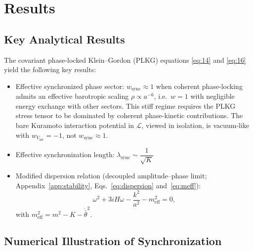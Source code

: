 
\section{Results}
\label{sec:results}

\subsection{Key Analytical Results}
\label{subsec:analytical-results}

The covariant phase-locked Klein--Gordon (PLKG) equations \eqref{eq:14} and \eqref{eq:16}
yield the following key results:
\begin{itemize}
    \item Effective synchronized phase sector: $w_{\text{sync}} \approx 1$
          when coherent phase-locking admits an effective barotropic scaling $\rho\propto a^{-6}$, i.e.\ $w=1$ with negligible energy exchange with other sectors.
          This stiff regime requires the PLKG stress tensor to be dominated by coherent phase-kinetic contributions.
          The bare Kuramoto interaction potential in $\mathcal{L}$, viewed in isolation, is vacuum-like with $w_{V_{\text{int}}}=-1$, not $w_{\text{sync}}\approx 1$.
    \item Effective synchronization length:
          $\lambda_{\text{sync}} \sim \dfrac{1}{\sqrt{K}}$
    \item Modified dispersion relation (decoupled amplitude--phase limit; Appendix~\ref{app:stability}, Eqs.~\eqref{eq:dispersion} and~\eqref{eq:meff}):
      \begin{equation*}
      \omega^2 + 3iH\omega - \frac{k^2}{a^2} - m_{\text{eff}}^2 = 0,
      \end{equation*}
      with $m_{\text{eff}}^2 = m^2 - K - \dot{\bar{\theta}}^2$.
\end{itemize}

\subsection{Numerical Illustration of Synchronization}
\label{subsec:numerical}

